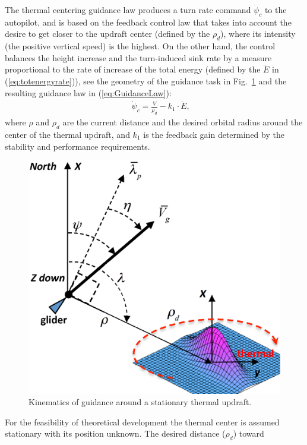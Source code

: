 \documentclass{ifacconf}
\begin{document}
The thermal centering guidance law produces a turn rate command
$\dot{\psi}_{c}$ to the autopilot, and is based on the feedback control law
that takes into account the desire to get closer to the updraft center
(defined by the $\rho_d$), where its intensity (the positive vertical speed)
is the highest. On the other hand, the control balances the height increase
and the turn-induced sink rate by a measure proportional to the rate of
increase of the total energy (defined by the $\ddot{E}$ in
(\ref{eq:totenergyrate})), see the geometry of the guidance task in
Fig.~\ref{fig:ThermaG} and the resulting guidance law in
(\ref{eq:GuidanceLaw}):
\begin{eqnarray}
    && \dot{\psi}_{c}=\frac{V}{\rho_d}-k_1 \cdot \ddot{E},
    \label{eq:GuidanceLaw}
\end{eqnarray}
where $\rho$ and $\rho_d$ are the current distance and the desired orbital
radius around the center of the thermal updraft, and $k_1$ is the feedback
gain determined by the stability and performance requirements.
\begin{figure}[thpb]
  \centering
  \includegraphics[scale=0.3]{Figures/ThermalG.eps}
  \caption{Kinematics of guidance around a stationary thermal updraft.}
  \label{fig:ThermaG}
\end{figure}
For the feasibility of theoretical development the thermal center is assumed
stationary with its position unknown. The desired distance ($\rho_d$) toward
\end{document}
